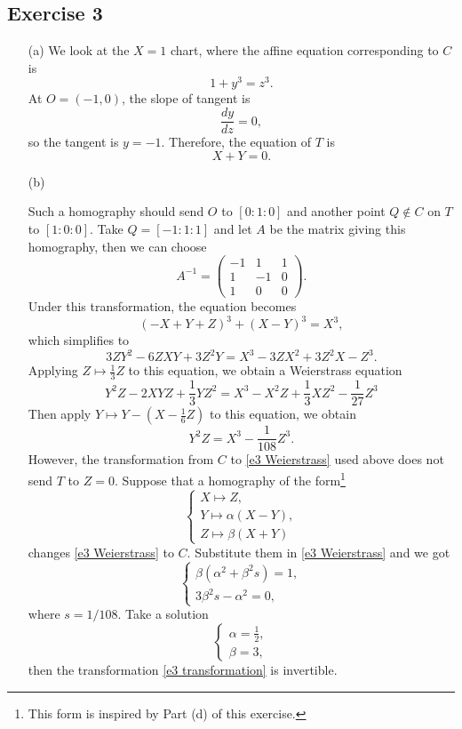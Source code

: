 \documentclass{article}
\theoremstyle{definition}
\theoremstyle{remark}
\begin{document}
\subsection*{Exercise 3}
\begin{enumerate}
    \item [(a)]
    We look at the $X = 1$ chart, where the affine equation corresponding to $C$ is \[1 + y^3 = z^3.\]
    At $O = (-1, 0)$, the slope of tangent is \[\frac{dy}{dz} = 0,\]
    so the tangent is $y = -1$. Therefore, the equation of $T$ is\[X+Y = 0.\]
    \item [(b)]
    
    Such a homography should send $O$ to $[0 : 1 : 0]$ and another point $Q\notin C$  on $T$ to $[1 : 0 : 0]$. Take $Q = [-1 : 1 : 1]$ and let $A$ be the matrix giving this homography, then we can choose \[A^{-1} = \begin{pmatrix}
        -1&1&1\\1&-1&0\\1&0&0
    \end{pmatrix}.\]
    Under this transformation, the equation becomes
    \[(-X+Y+Z)^3 + (X-Y)^3 = X^3,\]
    which simplifies to \[3ZY^2 - 6ZXY +3Z^2Y = X^3 - 3ZX^2 + 3Z^2X - Z^3.\]
    Applying $Z\mapsto \frac{1}{3}Z$ to this equation, we obtain a Weierstrass equation
    \[Y^2Z - 2XYZ + \frac{1}{3}YZ^2 = X^3 - X^2Z + \frac{1}{3}XZ^2 - \frac{1}{27}Z^3\]
    Then apply $Y\mapsto Y - \left(X-\frac{1}{6}Z\right)$ to this equation, we obtain \begin{equation}\label{e3 Weierstrass}
        Y^2Z = X^3-\frac{1}{108}Z^3.
    \end{equation}
    However, the transformation from $C$ to \cref{e3 Weierstrass} used above does not send $T$ to $Z = 0$. Suppose that a homography of the form\footnote{This form is inspired by Part (d) of this exercise.} \begin{equation}\label{e3 transformation}
        \begin{cases}
            X\mapsto Z,\\
            Y\mapsto \alpha (X-Y),\\
            Z\mapsto \beta (X + Y)
        \end{cases}
    \end{equation} changes \cref{e3 Weierstrass} to $C$.
    Substitute them in \cref{e3 Weierstrass} and we got \[\begin{cases}
        \beta(\alpha^2+\beta^2s) = 1,\\
        3\beta^2s - \alpha^2 = 0,
    \end{cases}\] where $s = 1/108$.
    Take a solution \[\begin{cases}
        \alpha = \frac{1}{2},\\\beta = 3,
    \end{cases}\]
    then the transformation \cref{e3 transformation} is invertible.


\end{enumerate}
\end{document}
